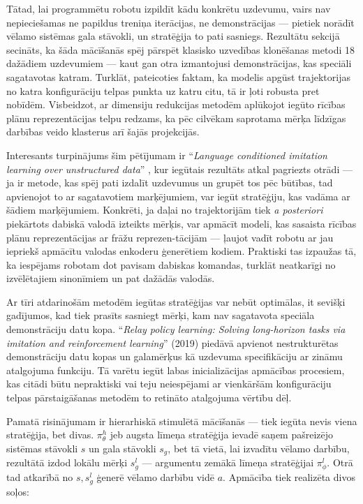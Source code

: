 \documentclass[12pt, a4paper]{article}
\numberwithin{equation}{section} %
\begin{document}
Tātad, lai programmētu robotu izpildīt kādu konkrētu uzdevumu, vairs nav nepieciešamas ne papildus treniņa iterācijas, ne demonstrācijas --- pietiek norādīt vēlamo sistēmas gala stāvokli, un stratēģija to pati sasniegs. Rezultātu sekcijā secināts, ka šāda mācīšanās spēj pārspēt klasisko uzvedības klonēšanas metodi 18 dažādiem uzdevumiem --- kaut gan otra izmantojusi demonstrācijas, kas speciāli sagatavotas katram. Turklāt, pateicoties faktam, ka modelis apgūst trajektorijas no katra konfigurāciju telpas punkta uz katru citu, tā ir ļoti robusta pret nobīdēm. Visbeidzot, ar dimensiju redukcijas metodēm aplūkojot iegūto rīcības plānu reprezentācijas telpu redzams, ka pēc cilvēkam saprotama mērķa līdzīgas darbības veido klasterus arī šajās projekcijās.

Interesants turpinājums šim pētījumam ir ``\textit{Language conditioned imitation learning over unstructured data}'' \cite{lynch2021language}, kur iegūtais rezultāts atkal pagriezts otrādi --- ja ir metode, kas spēj pati izdalīt uzdevumus un grupēt tos pēc būtības, tad apvienojot to ar sagatavotiem marķējumiem, var iegūt stratēģiju, kas vadāma ar šādiem marķējumiem. Konkrēti, ja daļai no trajektorijām tiek \textit{a posteriori} piekārtots dabiskā valodā izteikts mērķis, var apmācīt modeli, kas sasaista rīcības plānu reprezentācijas ar frāžu reprezen-tācijām --- ļaujot vadīt robotu ar jau iepriekš apmācītu valodas enkoderu ģenerētiem kodiem. Praktiski tas izpaužas tā, ka iespējams robotam dot pavisam dabiskas komandas, turklāt neatkarīgi no izvēlētajiem sinonīmiem un pat dažādās valodās.

Ar tīri atdarinošām metodēm iegūtas stratēģijas var nebūt optimālas, it sevišķi gadījumos, kad tiek prasīts sasniegt mērķi, kam nav sagatavota speciāla demonstrāciju datu kopa. ``\textit{Relay policy learning: Solving long-horizon tasks via imitation and reinforcement learning}'' \cite{gupta2019relay} (2019) piedāvā apvienot nestrukturētas demonstrāciju datu kopas un galamērķus kā uzdevuma specifikāciju ar zināmu atalgojuma funkciju. Tā varētu iegūt labas inicializācijas apmācības procesiem, kas citādi būtu nepraktiski vai teju neiespējami ar vienkāršām konfigurāciju telpas pārstaigāšanas metodēm to retināto atalgojuma vērtību dēļ.

Pamatā risinājumam ir hierarhiskā stimulētā mācīšanās --- tiek iegūta nevis viena stratēģija, bet divas. $\pi_{\theta}^h$ jeb augsta līmeņa stratēģija ievadē saņem pašreizējo sistēmas stāvokli $s$ un gala stāvokli $s_g$, bet tā vietā, lai izvadītu vēlamo darbību, rezultātā izdod lokālu mērķi $s_g^l$ --- argumentu zemākā līmeņa stratēģijai $\pi_{\phi}^l$. Otrā tad atkarībā no $s,s_g^l$ ģenerē vēlamo darbību vidē $a$. Apmācība tiek realizēta divos soļos:
\end{document}
